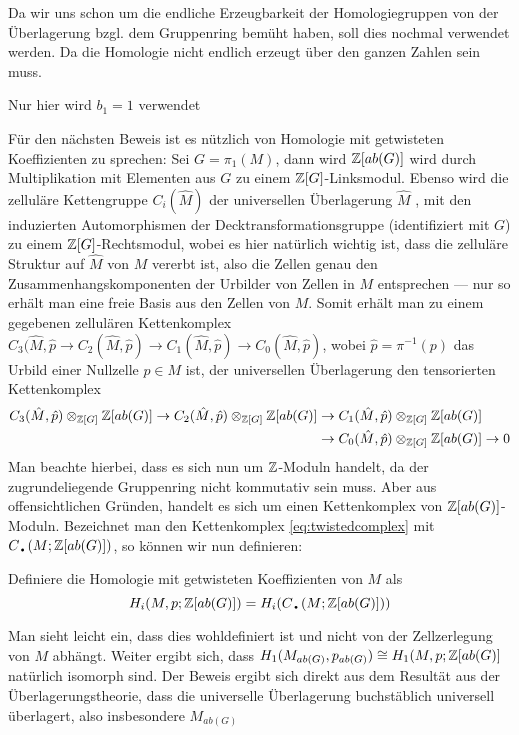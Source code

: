 Da wir uns schon um die endliche Erzeugbarkeit der Homologiegruppen von der Überlagerung bzgl. dem Gruppenring bemüht haben, soll dies nochmal verwendet werden. Da die Homologie nicht endlich erzeugt über den ganzen Zahlen sein muss.


Nur hier wird $b_1=1$ verwendet

	Für den nächsten Beweis ist es nützlich von Homologie mit getwisteten Koeffizienten zu sprechen: Sei $G=\pi_1(M)$, dann wird $\mathbb{Z}[ab(G)]$ wird durch Multiplikation mit Elementen aus $G$ zu einem $\mathbb{Z}[G]$-Linksmodul. Ebenso wird die zelluläre Kettengruppe $C_i(\hat M)$ der universellen Überlagerung $\hat M$ , mit den induzierten Automorphismen der Decktransformationsgruppe (identifiziert mit $G$) zu einem $\mathbb{Z}[G]$-Rechtsmodul, wobei es hier natürlich wichtig ist, dass die zelluläre Struktur auf $\hat M$ von $M$ vererbt ist, also die Zellen genau den Zusammenhangskomponenten der Urbilder von Zellen in $M$ entsprechen --- nur so erhält man eine freie Basis aus den Zellen von $M$. Somit erhält man zu einem gegebenen zellulären Kettenkomplex $C_3(\hat M,\hat p \to C_2(\hat M,\hat p) \to C_1(\hat M,\hat p) \to C_0(\hat M,\hat p)$, wobei $\hat p = \pi^{-1}(p)$ das Urbild einer Nullzelle $p\in M$ ist, der universellen Überlagerung den tensorierten Kettenkomplex 
\begin{align}
			C_3(\hat M,\hat p)\otimes_{\mathbb{Z}[G]}\mathbb{Z}[ab(G)] \to C_2(\hat M,\hat p)\otimes_{\mathbb{Z}[G]}\mathbb{Z}[ab(G)]& \to C_1(\hat M,\hat p)\otimes_{\mathbb{Z}[G]}\mathbb{Z}[ab(G)] \label{eq:twistedcomplex}\\
			& \to C_0(\hat M,\hat p)\otimes_{\mathbb{Z}[G]}\mathbb{Z}[ab(G)] \to 0 \notag
	\end{align}	
	Man beachte hierbei, dass es sich nun um $\mathbb{Z}$-Moduln handelt, da der zugrundeliegende Gruppenring nicht kommutativ sein muss. Aber aus offensichtlichen Gründen, handelt es sich um einen Kettenkomplex von $\mathbb{Z}[ab(G)]$-Moduln. Bezeichnet man den Kettenkomplex \eqref{eq:twistedcomplex} mit $C_\text{\textbullet}(M;\ZZ[ab(G)])$, so können wir nun definieren:

	\begin{defn}
		Definiere die Homologie mit getwisteten Koeffizienten von $M$ als
		\[
		 H_i(M,p;\ZZ[ab(G)])=H_i(C_\text{\textbullet}(M;\ZZ[ab(G)])) 	
		 \] 
	\end{defn}

	Man sieht leicht ein, dass dies wohldefiniert ist und nicht von der Zellzerlegung von $M$ abhängt. Weiter ergibt sich, dass $H_1( M_{ab(G)} ,  p_{ab(G)}) \cong H_1(M,p;\mathbb{Z}[ab(G)]$ natürlich isomorph sind. Der Beweis ergibt sich direkt aus dem Resultät aus der Überlagerungstheorie, dass die universelle Überlagerung buchstäblich universell überlagert, also insbesondere $M_{ab(G)}$ 
    
